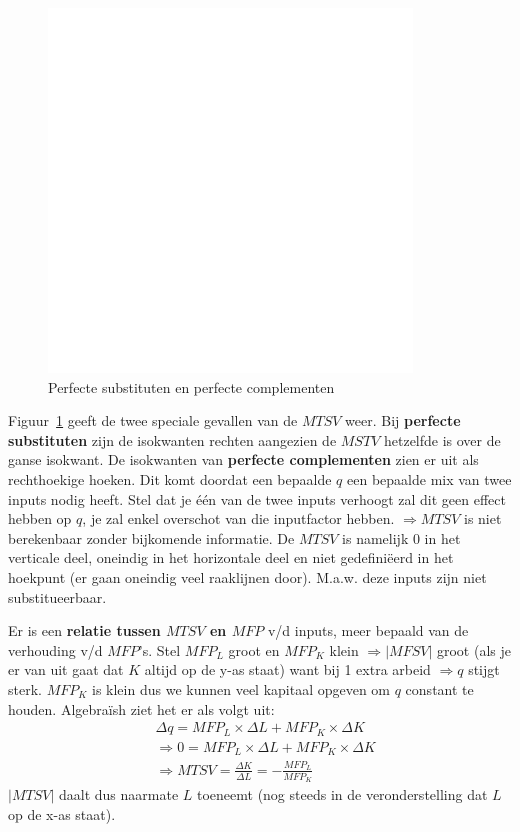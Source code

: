 \begin{figure}[htbp]
	\centering
	\includegraphics[scale=0.4]{Images/white.png}
	\caption{Perfecte substituten en perfecte complementen}
	\label{fig:perfecteSubstitutenEnPerfecteComplementen}
\end{figure}

Figuur~\ref{fig:perfecteSubstitutenEnPerfecteComplementen} geeft de twee speciale gevallen van de $MTSV$ weer. Bij \textbf{perfecte substituten} zijn de isokwanten rechten aangezien de $MSTV$ hetzelfde is over de ganse isokwant. De isokwanten van \textbf{perfecte complementen} zien er uit als rechthoekige hoeken. Dit komt doordat een bepaalde $q$ een bepaalde mix van twee inputs nodig heeft. Stel dat je \'e\'en van de twee inputs verhoogt zal dit geen effect hebben op $q$, je zal enkel overschot van die inputfactor hebben. $\Rightarrow MTSV$ is niet berekenbaar zonder bijkomende informatie. De $MTSV$ is namelijk 0 in het verticale deel, oneindig in het horizontale deel en niet gedefini\"eerd in het hoekpunt (er gaan oneindig veel raaklijnen door). M.a.w. deze inputs zijn niet substitueerbaar.

Er is een \textbf{relatie tussen $MTSV$ en $MFP$} v/d inputs, meer bepaald van de verhouding v/d $MFP$'s. Stel $MFP_L$ groot en $MFP_K$ klein $\Rightarrow |MFSV|$ groot (als je er van uit gaat dat $K$ altijd op de y-as staat) want bij 1 extra arbeid $\Rightarrow q$ stijgt sterk. $MFP_K$ is klein dus we kunnen veel kapitaal opgeven om $q$ constant te houden. Algebra\"ish ziet het er als volgt uit:
\begin{align}
	&\Delta q = MFP_L \times \Delta L + MFP_K \times \Delta K \\
	&\Rightarrow 0 = MFP_L \times \Delta L + MFP_K \times \Delta K \\
	&\Rightarrow MTSV = \frac{\Delta K}{\Delta L} = -\frac{MFP_L}{MFP_K}
\end{align}
$|MTSV|$ daalt dus naarmate $L$ toeneemt (nog steeds in de veronderstelling dat $L$ op de x-as staat).

